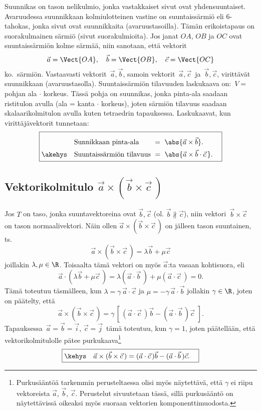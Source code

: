 Suunnikas on tason nelikulmio, jonka vastakkaiset sivut ovat yhdensuuntaiset. 
Avaruudessa suunnikkaan kolmiulotteinen vastine on suuntaissärmiö eli $6$-tahokas, jonka
sivut ovat suunnikkaita (avaruustasoilla). Tämän erikoistapaus on suorakulmainen särmiö
(sivut suorakulmioita). Jos janat $OA$, $OB$ ja $OC$ ovat suuntaissärmiön kolme särmää,
niin sanotaan, että vektorit
\[
\vec a=\Vect{OA}, \quad \vec b=\Vect{OB}, \quad \vec c=\Vect{OC}
\]
%
 ko.\ särmiön. Vastaavasti vektorit $\,\vec a,\vec b$, samoin vektorit
$\,\vec a,\vec c\,$ ja $\,\vec b,\vec c$, virittävät suunnikkaan (avaruustasolla).
Suuntaissärmiön tilavuuden laskukaava on: $\,V=$ pohjan ala $\cdot$ korkeus. Tässä pohja on
suunnikas, jonka pinta-ala saadaan ristitulon avulla (ala = kanta $\cdot$ korkeus), joten 
särmiön tilavuus saadaan skalaarikolmitulon avulla kuten tetraedrin tapauksessa. Laskukaavat,
kun virittäjävektorit tunnetaan:
\[
\boxed{ \begin{aligned}
\rule{0mm}{5mm}\quad &\text{Sunnikkaan pinta-ala} \qquad =\ \abs{\vec a \times \vec b}. \\
\akehys\quad &\text{Suuntaissärmiön tilavuus}\   
                   =\ \abs{\vec a \times \vec b \cdot \vec c\,}. \quad
        \end{aligned} }
\]

\subsection{Vektorikolmitulo $\vec a \times (\vec b \times \vec c\,)$}
\index{vektorikolmitulo|vahv}

Jos $T$ on taso, jonka suuntavektoreina ovat $\vec b, \vec c$ (ol. $\vec b \nparallel \vec c$),
niin vektori $\,\vec b \times \vec c\,$ on tason normaalivektori. Näin ollen 
$\vec a  \times(\vec b \times \vec c\,)$ on jälleen tason suuntainen, ts.
\[
\vec a  \times(\vec b \times \vec c\,) = \lambda \vec b + \mu \vec c
\]
joillakin $\lambda, \mu \in \R$. Toisaalta tämä vektori on myös $\vec a$:ta vasaan kohtisuora,
eli
\[
\vec a \cdot (\lambda \vec b + \mu \vec c\,) 
                     = \lambda (\vec a \cdot \vec b\,) + \mu(\vec a \cdot \vec c\,) = 0.
\]
Tämä toteutuu täsmälleen, kun $\lambda = \gamma\,\vec a \cdot \vec c$ ja 
$\mu = - \gamma\,\vec a \cdot \vec b$ jollakin $\gamma \in \R$, joten on päätelty, että
\[
\vec a \times (\vec b \times \vec c\,) 
             = \gamma\,[\,(\vec a \cdot \vec c\,)\vec b - (\vec a \cdot \vec b\,)\vec c\,\,].
\]
Tapauksessa $\,\vec a = \vec b = \vec i$, $\vec c = \vec j\,$ tämä toteutuu, kun $\gamma=1$,
joten päätellään, että vektorikolmitulolle pätee purkukaava\footnote[2]{Purkusääntöä tarkemmin
perusteltaessa olisi myös näytettävä, että  $\gamma$ ei riipu vektoreista $\vec a$, $\vec b$,
$\vec c$. Perustelut sivuutetaan tässä, sillä purkusääntö on näytettävissä oikeaksi myös
suoraan vektorien komponenttimuodosta.}
\[
\boxed{\kehys\quad \vec a \times (\vec b \times \vec c\,)
                    =(\vec a \cdot \vec c\,)\vec b - (\vec a \cdot \vec b\,)\vec c. \quad}
\]

